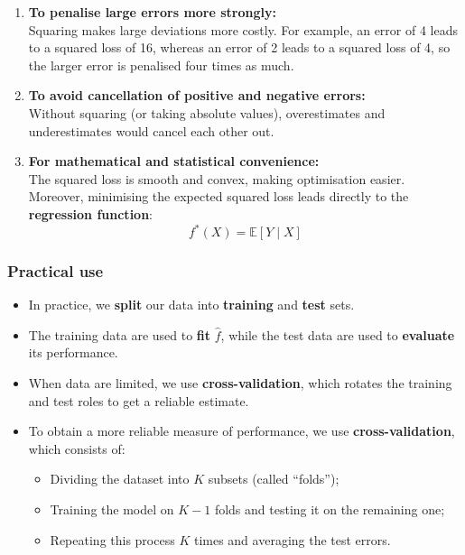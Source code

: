 \documentclass[
  letterpaper,
  DIV=11,
  numbers=noendperiod]{scrartcl}
\providecommand{\tightlist}{%
  \setlength{\itemsep}{0pt}\setlength{\parskip}{0pt}}\usepackage{longtable,booktabs,array}
\begin{document}
\begin{enumerate}
\def\labelenumi{\arabic{enumi}.}
\tightlist
\item
  \textbf{To penalise large errors more strongly:}\\
  Squaring makes large deviations more costly. For example, an error of
  4 leads to a squared loss of 16, whereas an error of 2 leads to a
  squared loss of 4, so the larger error is penalised four times as
  much.
\item
  \textbf{To avoid cancellation of positive and negative errors:}\\
  Without squaring (or taking absolute values), overestimates and
  underestimates would cancel each other out.
\item
  \textbf{For mathematical and statistical convenience:}\\
  The squared loss is smooth and convex, making optimisation easier.\\
  Moreover, minimising the expected squared loss leads directly to the
  \textbf{regression function}: \[f^*(X) = \mathbb{E}[Y \mid X]\]
\end{enumerate}

\subsubsection{Practical use}\label{practical-use}

\begin{itemize}
\tightlist
\item
  In practice, we \textbf{split} our data into \textbf{training} and
  \textbf{test} sets.
\item
  The training data are used to \textbf{fit} \(\hat{f}\), while the test
  data are used to \textbf{evaluate} its performance.
\item
  When data are limited, we use \textbf{cross-validation}, which rotates
  the training and test roles to get a reliable estimate.
\item
  To obtain a more reliable measure of performance, we use
  \textbf{cross-validation}, which consists of:

  \begin{itemize}
  \tightlist
  \item
    Dividing the dataset into \(K\) subsets (called ``folds'');
  \item
    Training the model on \(K-1\) folds and testing it on the remaining
    one;
  \item
    Repeating this process \(K\) times and averaging the test errors.
  \end{itemize}
\end{itemize}
\end{document}
